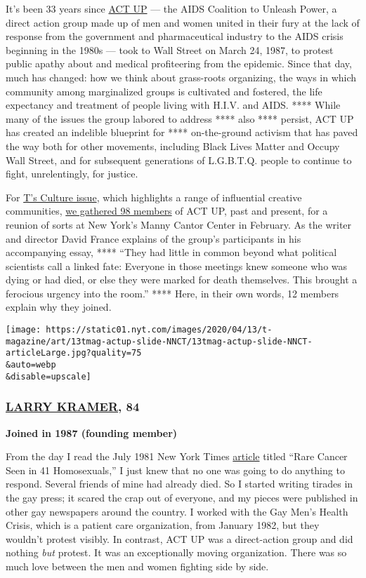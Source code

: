 It's been 33 years since \href{https://actupny.com/}{ACT UP} --- the
AIDS Coalition to Unleash Power, a direct action group made up of men
and women united in their fury at the lack of response from the
government and pharmaceutical industry to the AIDS crisis beginning in
the 1980s --- took to Wall Street on March 24, 1987, to protest public
apathy about and medical profiteering from the epidemic. Since that day,
much has changed: how we think about grass-roots organizing, the ways in
which community among marginalized groups is cultivated and fostered,
the life expectancy and treatment of people living with H.I.V. and AIDS.
**** While many of the issues the group labored to address **** also
**** persist, ACT UP has created an indelible blueprint for ****
on-the-ground activism that has paved the way both for other movements,
including Black Lives Matter and Occupy Wall Street, and for subsequent
generations of L.G.B.T.Q. people to continue to fight, unrelentingly,
for justice.

For
\href{https://www.nytimes.com/interactive/2020/04/13/t-magazine/culture-issue-2020.html}{T's
Culture issue}, which highlights a range of influential creative
communities,
\href{https://www.nytimes.com/interactive/2020/04/13/t-magazine/act-up-aids.html}{we
gathered 98 members} of ACT UP, past and present, for a reunion of sorts
at New York's Manny Cantor Center in February. As the writer and
director David France explains of the group's participants in his
accompanying essay, **** ``They had little in common beyond what
political scientists call a linked fate: Everyone in those meetings knew
someone who was dying or had died, or else they were marked for death
themselves. This brought a ferocious urgency into the room.'' **** Here,
in their own words, 12 members explain why they joined.

\texttt{[image: https://static01.nyt.com/images/2020/04/13/t-magazine/art/13tmag-actup-slide-NNCT/13tmag-actup-slide-NNCT-articleLarge.jpg?quality=75\\\&auto=webp\\\&disable=upscale]}

\hypertarget{larry-kramer-84}{%
\subsubsection{\texorpdfstring{\href{https://www.nytimes.com/2020/05/27/us/larry-kramer-dead.html}{LARRY
KRAMER}, 84}{LARRY KRAMER, 84}}\label{larry-kramer-84}}

\textbf{Joined in 1987 (founding member)}

From the day I read the July 1981 New York Times
\href{https://www.nytimes.com/1981/07/03/us/rare-cancer-seen-in-41-homosexuals.html}{article}
titled ``Rare Cancer Seen in 41 Homosexuals,'' I just knew that no one
was going to do anything to respond. Several friends of mine had already
died. So I started writing tirades in the gay press; it scared the crap
out of everyone, and my pieces were published in other gay newspapers
around the country. I worked with the Gay Men's Health Crisis, which is
a patient care organization, from January 1982, but they wouldn't
protest visibly. In contrast, ACT UP was a direct-action group and did
nothing \emph{but} protest. It was an exceptionally moving organization.
There was so much love between the men and women fighting side by side.

